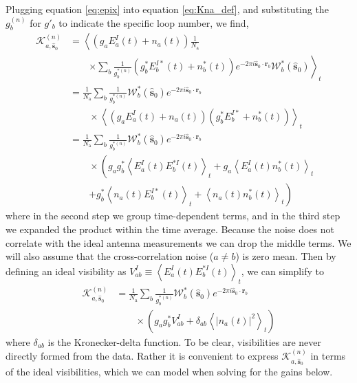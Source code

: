\documentclass[a4paper,fleqn,usenatbib]{mnras}
\newcommand{\Nant}{\ensuremath{N_{\mathrm{a}}}}
\newcommand{\spix}{\ensuremath{\hat{\mathbf{s}}_{0}}}
\newcommand{\Kna}[1][n]{\ensuremath{\mathcal{K}^{(#1)}_{a,\spix}}}
\newcommand{\rb}{\ensuremath{\mathbf{r}_b}}
\begin{document}
Plugging equation \ref{eq:epix} into equation \ref{eq:Kna_def}, 
and substituting the $g^{(n)}_b$ for $g'_b$ to indicate the specific loop number,
we find,
\begin{align}
\Kna & = \left<\left(g_a E_a^I(t)+n_a(t)\right) \frac{1}{\Nant} \right. \nonumber \\
& \qquad \left. \times \sum_b \frac{1}{g^{*(n)}_b}\left(g^*_bE_b^{I*}(t)+n^*_b(t)\right) e^{-2\pi i \spix \cdot \rb} \mathcal{W}^*_b(\spix)\right>_t \nonumber \\
& = \frac{1}{\Nant} \sum_b \frac{1}{g^{*(n)}_b} \mathcal{W}^*_b(\spix) e^{-2\pi i \spix \cdot \rb} \nonumber \\
& \qquad \times \left<\left(g_aE_a^I(t)+n_a(t)\right)\left(g^*_bE_b^{I*}+n^*_b(t)\right) \right>_t \nonumber \\
& = \frac{1}{\Nant} \sum_b \frac{1}{g^{*(n)}_b} \mathcal{W}^*_b(\spix) e^{-2\pi i \spix \cdot \rb} \nonumber \\
& \qquad \times \left(g_a g^*_b \left<E^I_a(t)E^{*I}_b(t)\right>_t + g_a\left<E_a^I(t)n^*_b(t)\right>_t \right. \nonumber \\
& \qquad \left. + g^*_b\left<n_a(t)E^{I*}_b(t)\right>_t + \left<n_a(t) n^*_b(t)\right>_t\right)  
\end{align}
where in the second step we group time-dependent terms, 
and in the third step we expanded the product within the time average.
Because the noise does not correlate with the ideal antenna measurements we can
drop the middle terms. We will also assume that the cross-correlation noise ($a\ne b$) 
is zero mean. Then by defining an ideal visibility as
$V_{ab}^I \equiv \left<E^I_a(t)E^{*I}_b(t)\right>_t$, we can simplify to
\begin{align}\label{eq:Kna}
\Kna & = \frac{1}{\Nant} \sum_b \frac{1}{g^{*(n)}_b} \mathcal{W}^*_b(\spix) e^{-2\pi i \spix \cdot \rb}\nonumber \\
& \qquad \times \left( g_ag_b^* V_{ab}^I + \delta_{ab}\left<|n_a(t)|^2\right>_t\right)
\end{align}
where $\delta_{ab}$ is the Kronecker-delta function. To be clear, visibilities are never directly 
formed from the data. Rather it is convenient to express $\Kna$ in terms of the ideal 
visibilities, which we can model when solving for the gains below.
\end{document}
